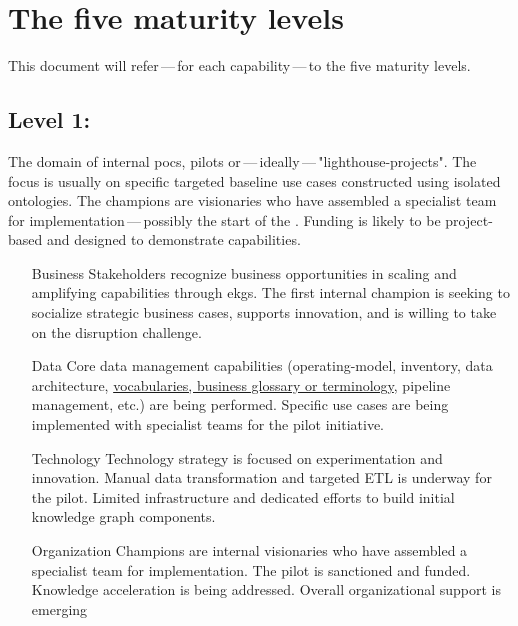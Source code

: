 \section{The five maturity levels}\label{sec:the-five-maturity-levels}

This document will refer\,---\,for each capability\,---\,to the five maturity levels.

\subsection{Level 1: \ekgmmLevelOneLabel}

The domain of internal \glspl{poc}, pilots or\,---\,ideally\,---\,"\glspl{lighthouse-project}".
The focus is usually on specific targeted baseline use cases constructed using isolated ontologies.
The champions are visionaries who have assembled a specialist team for implementation\,---\,possibly the
start of the .
Funding is likely to be project-based and designed to demonstrate capabilities.

\begin{itemize}[leftmargin=1in,font=\bfseries]

    \item[Business]     Stakeholders recognize business opportunities in scaling and amplifying capabilities
                        through \glspl{ekg}.
                        The first internal champion is seeking to socialize strategic business cases,
                        supports innovation, and is willing to take on the disruption challenge.
    \item[Data]         Core data management capabilities (\gls{operating-model}, inventory, data architecture,
                        \hyperref[sec:ekg-mm-business-vocabularies]{vocabularies, business glossary or terminology},
                        pipeline management, etc.) are being performed.
                        Specific use cases are being implemented with specialist teams for the pilot initiative.
    \item[Technology]   Technology strategy is focused on experimentation and innovation.
                        Manual data transformation and targeted ETL is underway for the pilot.
                        Limited infrastructure and dedicated efforts to build initial knowledge graph components.
    \item[Organization] Champions are internal visionaries who have assembled a specialist team for implementation.
                        The pilot is sanctioned and funded.
                        Knowledge acceleration is being addressed.
                        Overall organizational support is emerging
\end{itemize}

